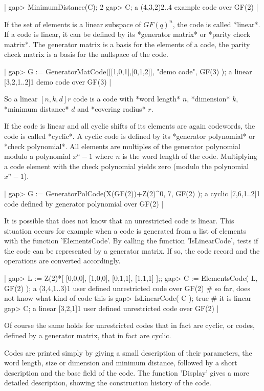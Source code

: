 |    gap> MinimumDistance(C);
    2
    gap> C;
    a (4,3,2)2..4 example code over GF(2) |

If the set  of elements is a linear   subspace of $GF(q)^n$, the code  is
called *linear*. If a code is linear, it can be defined by its *generator
matrix* or *parity  check matrix*.  The generator  matrix is  a basis for
the elements   of a code,   the parity check  matrix is  a  basis for the
nullspace of the code.

|    gap> G := GeneratorMatCode([[1,0,1],[0,1,2]], "demo code", GF(3) );
    a linear [3,2,1..2]1 demo code over GF(3) |

So   a  linear $[n,  k, d]r$  code is  a   code  with  *word length* $n$,
*dimension* $k$, *minimum distance* $d$ and *covering radius* $r$.

If the code is linear  and all cyclic shifts   of its elements are  again
codewords, the code is called *cyclic*.  A cyclic code  is defined by its
*generator polynomial* or  *check polynomial*. All elements are multiples
of the generator polynomial modulo a polynomial $x^n -1$ where $n$ is the
word  length of  the  code. Multiplying  a   code element with  the check
polynomial yields zero (modulo the polynomial $x^n -1$).

|    gap> G := GeneratorPolCode(X(GF(2))+Z(2)^0, 7, GF(2) );
    a cyclic [7,6,1..2]1 code defined by generator polynomial over GF(2) |

It is  possible that {\GUAVA} does not  know that an unrestricted code is
linear.  This situation occurs for example when  a code is generated from
a list of elements  with   the function  'ElementsCode'. By  calling  the
function 'IsLinearCode', {\GUAVA} tests if the code can be represented by
a generator matrix. If   so,  the code   record and the  operations   are
converted accordingly.

|    gap> L := Z(2)*[ [0,0,0], [1,0,0], [0,1,1], [1,1,1] ];;
    gap> C := ElementsCode( L, GF(2) );
    a (3,4,1..3)1 user defined unrestricted code over GF(2)
    # so far, {\GUAVA} does not know what kind of code this is
    gap> IsLinearCode( C );
    true                      # it is linear
    gap> C;
    a linear [3,2,1]1 user defined unrestricted code over GF(2) |

Of course the same holds for unrestricted codes that  in fact are cyclic,
or codes, defined by a generator matrix, that in fact are cyclic.

Codes   are  printed simply  by  giving  a   small  description of  their
parameters,  the word  length, size  or  dimension and minimum  distance,
followed by a short description  and  the base field  of  the code.   The
function 'Display'  gives a    more  detailed description,   showing  the
construction history of the code.

